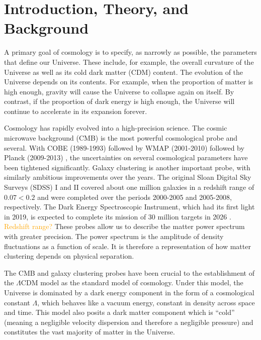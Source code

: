 \chapter{Introduction, Theory, and Background}


A primary goal of cosmology is to specify, as narrowly as possible, the 
parameters that define our Universe. These include, for example, the overall 
curvature of the Universe as well as its cold dark matter (CDM) content. The 
evolution of the Universe depends on its contents. For example, when the 
proportion of matter is high enough,
gravity will cause the Universe to collapse again on itself. By contrast, if
the proportion of dark energy is high enough, the Universe will continue to
accelerate in its expansion forever.

Cosmology has rapidly evolved into a high-precision science. The cosmic
microwave background (CMB) is the most powerful cosmological probe and
several. With
COBE (1989-1993)  followed by WMAP (2001-2010)  followed 
by Planck (2009-2013) , the uncertainties on several cosmological 
parameters have been tightened significantly.
Galaxy clustering is another important probe, with similarly ambitious
improvements over the years. The original Sloan Digital Sky Surveys (SDSS) I
and II covered about one million galaxies in a redshift range of $0.07 < 0.2$
and were completed over the periods 2000-2005 and 2005-2008, respectively.
The Dark Energy Spectroscopic Instrument, which had its first light in 2019, is expected to complete its mission of 30 million targets in 2026
. \textcolor{orange}{Redshift range?}
These probes allow us to describe the matter power spectrum
with greater precision. The power spectrum is the amplitude of density
fluctuations as a function of scale. It is therefore a representation of how
matter clustering depends on physical separation.

The CMB and galaxy clustering probes have been crucial to the establishment
of the $\Lambda$CDM model as the standard model of cosmology. Under this
model, the Universe is dominated by a dark energy component in the form of a
cosmological constant $\Lambda$, which behaves like a vacuum energy, constant
in density across space and time. This model also posits a dark matter
component which is ``cold'' (meaning a negligible velocity dispersion and
therefore a negligible pressure) and constitutes the vast majority of matter
in the Universe.

